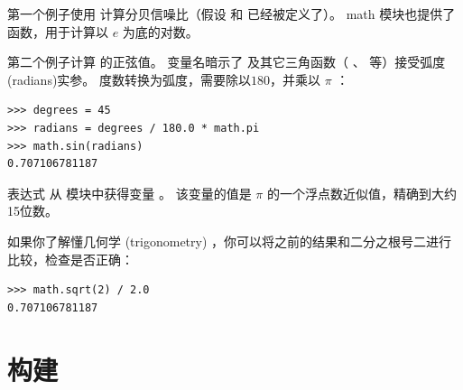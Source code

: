 第一个例子使用 计算分贝信噪比（假设   和 已经被定义了）。
math 模块也提供了  函数，用于计算以 $e$ 为底的对数。
    
    


第二个例子计算  的正弦值。
变量名暗示了  及其它三角函数（ 、 等）接受弧度(radians)实参。 度数转换为弧度，需要除以$180$，并乘以 $\pi$ ：


\begin{lstlisting}
>>> degrees = 45
>>> radians = degrees / 180.0 * math.pi
>>> math.sin(radians)
0.707106781187
\end{lstlisting}

%

表达式  从  模块中获得变量  。
该变量的值是 $\pi$ 的一个浮点数近似值，精确到大约15位数。
  \index{$\pi$}


如果你了解懂几何学 (trigonometry) ，你可以将之前的结果和二分之根号二进行比较，检查是否正确：
  

\begin{lstlisting}
>>> math.sqrt(2) / 2.0
0.707106781187
\end{lstlisting}
%

%
\section{构建}


